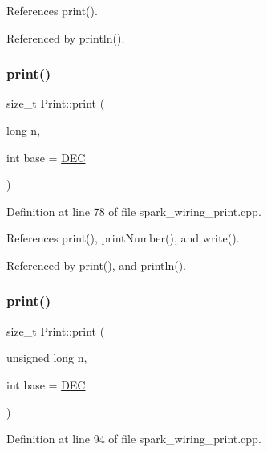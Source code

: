 References print().



Referenced by println().

\mbox{\label{class_print_ab1fb2a2384c7b9f628943f5046e7d1c1}} 
\subsubsection{\texorpdfstring{print()}{print()}\hspace{0.1cm}{\footnotesize\ttfamily [6/19]}}
{\footnotesize\ttfamily size\+\_\+t Print\+::print (\begin{DoxyParamCaption}\item[{long}]{n,  }\item[{int}]{base = {\ttfamily \hyperlink{docs_2src_2spark__wiring__print_8h_a26e216c38cffa0a9965fa7933ba558b1}{D\+EC}} }\end{DoxyParamCaption})}



Definition at line 78 of file spark\+\_\+wiring\+\_\+print.\+cpp.



References print(), print\+Number(), and write().



Referenced by print(), and println().

\mbox{\label{class_print_a26a40be7a557c0bc391a15dce9f06954}} 
\subsubsection{\texorpdfstring{print()}{print()}\hspace{0.1cm}{\footnotesize\ttfamily [7/19]}}
{\footnotesize\ttfamily size\+\_\+t Print\+::print (\begin{DoxyParamCaption}\item[{unsigned long}]{n,  }\item[{int}]{base = {\ttfamily \hyperlink{docs_2src_2spark__wiring__print_8h_a26e216c38cffa0a9965fa7933ba558b1}{D\+EC}} }\end{DoxyParamCaption})}



Definition at line 94 of file spark\+\_\+wiring\+\_\+print.\+cpp.



